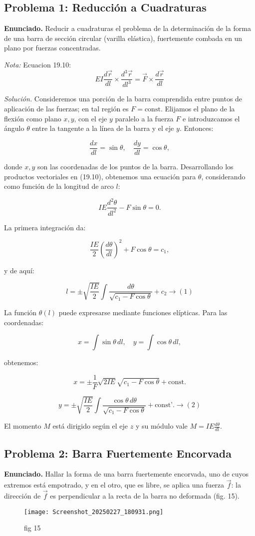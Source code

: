 \documentclass{article}
\begin{document}
\subsection*{Problema 1: Reducción a Cuadraturas}
\textbf{Enunciado.} Reducir a cuadraturas el problema de la determinación de la forma de una barra de sección circular (varilla elástica), fuertemente combada en un plano por fuerzas concentradas.

\textit{Nota:} Ecuacion 19.10: $$ EI\frac{d\vec{r}}{dl}\times \frac{d^{3}\vec{r}}{dl^{3}} = \vec{F}\times\frac{d\vec{r}}{dl}$$

\textit{Solución.} Consideremos una porción de la barra comprendida entre puntos de aplicación de las fuerzas; en tal región es $F = \text{const}$. Elijamos el plano de la flexión como plano $x, y$, con el eje $y$ paralelo a la fuerza $F$ e introduzcamos el ángulo $\theta$ entre la tangente a la línea de la barra y el eje $y$. Entonces:

$$
\frac{dx}{dl} = \sin \theta, \quad \frac{dy}{dl} = \cos \theta,
$$

donde $x, y$ son las coordenadas de los puntos de la barra. Desarrollando los productos vectoriales en (19.10), obtenemos una ecuación para $\theta$, considerando como función de la longitud de arco $l$:

$$
IE \frac{d^2 \theta}{dl^2} - F \sin \theta = 0.
$$

La primera integración da:

$$
\frac{IE}{2} \left( \frac{d\theta}{dl} \right)^2 + F \cos \theta = c_1,
$$

y de aquí:

$$
l = \pm \sqrt{\frac{IE}{2}} \int \frac{d\theta}{\sqrt{c_1 - F \cos \theta}} + c_2 \rightarrow (1)
$$

La función $\theta(l)$ puede expresarse mediante funciones elípticas. Para las coordenadas:

$$
x = \int \sin \theta \, dl, \quad y = \int \cos \theta \, dl,
$$

obtenemos:

$$
x = \pm \frac{1}{F} \sqrt{2IE} \sqrt{c_1 - F \cos \theta} + \text{const.}
$$

$$
y = \pm \sqrt{\frac{IE}{2}} \int \frac{\cos \theta \, d\theta}{\sqrt{c_1 - F \cos \theta}} + \text{const'.} \rightarrow (2)
$$

El momento $M$ está dirigido según el eje $z$ y su módulo vale $M = IE \frac{d\theta}{dl}$.

\subsection*{Problema 2: Barra Fuertemente Encorvada}
\textbf{Enunciado.} Hallar la forma de una barra fuertemente encorvada, uno de cuyos extremos está empotrado, y en el otro, que es libre, se aplica una fuerza $\vec{f}$: la dirección de $\vec{f}$ es perpendicular a la recta de la barra no deformada (fig. 15).
\begin{figure}[h]
    \centering
    \texttt{[image: Screenshot\_20250227\_180931.png]}
    \caption{fig 15}
\end{figure}
\end{document}
